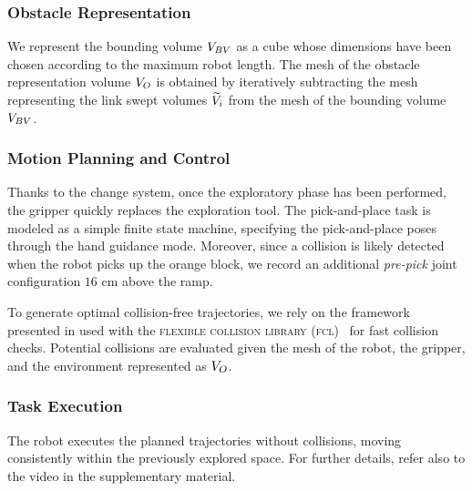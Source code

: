 \subsubsection{Obstacle Representation}
We represent the bounding volume ${V_{BV}}$ as a cube whose dimensions have been chosen according to the maximum robot length.
The mesh of the obstacle representation volume ${V_{O}}$ is obtained by iteratively subtracting the mesh representing the link swept volumes ${\widetilde{V}_{i}}$ from the mesh of the bounding volume ${V_{BV}}$.

\subsubsection{Motion Planning and Control}
Thanks to the change system,
once the exploratory phase has been performed, 
the gripper quickly replaces the exploration tool. 
The pick-and-place task is modeled as a simple finite state machine,
specifying the pick-and-place poses through the hand guidance mode.
Moreover, 
since a collision is likely detected when the robot picks up the orange block, 
we record an additional \textit{pre-pick} joint configuration $16$ cm above the ramp.

To generate optimal collision-free trajectories,
we rely on the framework presented in \cite{osorio2020unilateral} used with the \textsc{flexible collision library (fcl)}~\cite{pan2012fcl} 
for fast collision checks. 
Potential collisions are evaluated given the mesh of the robot, 
the gripper, 
and the environment represented as ${V_{O}}$.

\subsubsection{Task Execution}
The robot executes the planned trajectories without collisions, 
moving consistently within the previously explored space. 
For further details, 
refer also to the video in the supplementary material.


